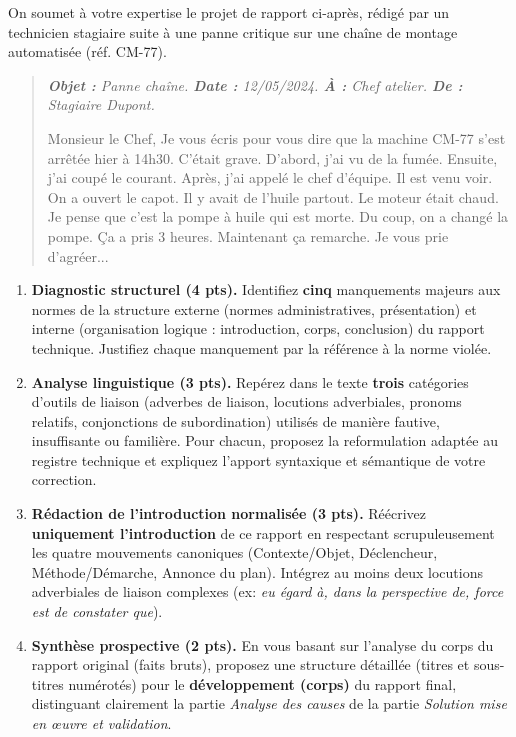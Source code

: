 \documentclass[11pt]{article}
\begin{document}
\begin{exercice}
On soumet à votre expertise le projet de rapport ci-après, rédigé par un technicien stagiaire suite à une panne critique sur une chaîne de montage automatisée (réf. CM-77).

\begin{quote}
\itshape
\textbf{Objet :} Panne chaîne.
\textbf{Date :} 12/05/2024.
\textbf{À :} Chef atelier.
\textbf{De :} Stagiaire Dupont.

Monsieur le Chef,
Je vous écris pour vous dire que la machine CM-77 s'est arrêtée hier à 14h30. C'était grave. D'abord, j'ai vu de la fumée. Ensuite, j'ai coupé le courant. Après, j'ai appelé le chef d'équipe. Il est venu voir. On a ouvert le capot. Il y avait de l'huile partout. Le moteur était chaud. Je pense que c'est la pompe à huile qui est morte. Du coup, on a changé la pompe. Ça a pris 3 heures. Maintenant ça remarche. Je vous prie d'agréer...
\end{quote}

\begin{enumerate}
    \item \textbf{Diagnostic structurel (4 pts).} Identifiez \textbf{cinq} manquements majeurs aux normes de la structure externe (normes administratives, présentation) et interne (organisation logique : introduction, corps, conclusion) du rapport technique. Justifiez chaque manquement par la référence à la norme violée.
    \item \textbf{Analyse linguistique (3 pts).} Repérez dans le texte \textbf{trois} catégories d'outils de liaison (adverbes de liaison, locutions adverbiales, pronoms relatifs, conjonctions de subordination) utilisés de manière fautive, insuffisante ou familière. Pour chacun, proposez la reformulation adaptée au registre technique et expliquez l'apport syntaxique et sémantique de votre correction.
    \item \textbf{Rédaction de l'introduction normalisée (3 pts).} Réécrivez \textbf{uniquement l'introduction} de ce rapport en respectant scrupuleusement les quatre mouvements canoniques (Contexte/Objet, Déclencheur, Méthode/Démarche, Annonce du plan). Intégrez au moins deux locutions adverbiales de liaison complexes (ex: \textit{eu égard à, dans la perspective de, force est de constater que}).
    \item \textbf{Synthèse prospective (2 pts).} En vous basant sur l'analyse du corps du rapport original (faits bruts), proposez une structure détaillée (titres et sous-titres numérotés) pour le \textbf{développement (corps)} du rapport final, distinguant clairement la partie \textit{Analyse des causes} de la partie \textit{Solution mise en œuvre et validation}.
\end{enumerate}
\end{exercice}
\end{document}
